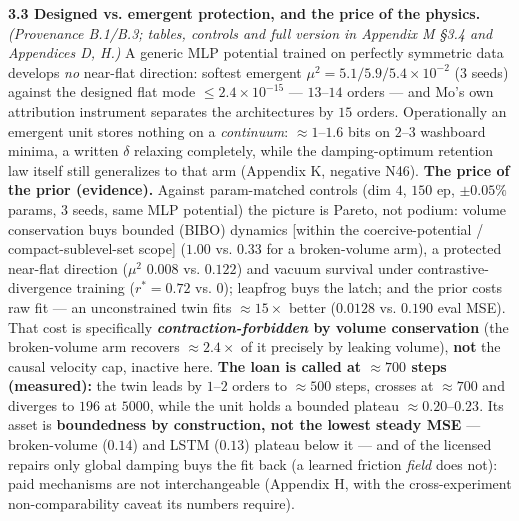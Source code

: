 \documentclass[10pt]{article}
\begin{document}
\textbf{3.3 Designed vs. emergent protection, and the price of the physics.} \emph{(Provenance B.1/B.3; tables, controls and full version in Appendix M \S3.4 and Appendices D, H.)} A generic MLP potential trained on perfectly symmetric data develops \emph{no} near-flat direction: softest emergent $\mu^2=5.1/5.9/5.4\!\times\!10^{-2}$ ($3$ seeds) against the designed flat mode $\le2.4\!\times\!10^{-15}$ --- $13$--$14$ orders --- and Mo's own attribution instrument separates the architectures by $15$ orders. Operationally an emergent unit stores nothing on a \emph{continuum}: $\approx1$--$1.6$ bits on $2$--$3$ washboard minima, a written $\delta$ relaxing completely, while the damping-optimum retention law itself still generalizes to that arm (Appendix K, negative N46). \textbf{The price of the prior (evidence).} Against param-matched controls (dim $4$, $150$ ep, $\pm0.05\%$ params, $3$ seeds, same MLP potential) the picture is Pareto, not podium: volume conservation buys bounded (BIBO) dynamics [within the coercive-potential / compact-sublevel-set scope] ($1.00$ vs. $0.33$ for a broken-volume arm), a protected near-flat direction ($\mu^2$ $0.008$ vs. $0.122$) and vacuum survival under contrastive-divergence training ($r^*=0.72$ vs. $0$); leapfrog buys the latch; and the prior costs raw fit --- an unconstrained twin fits $\approx15\times$ better ($0.0128$ vs. $0.190$ eval MSE). That cost is specifically \textbf{\emph{contraction-forbidden} by volume conservation} (the broken-volume arm recovers $\approx2.4\times$ of it precisely by leaking volume), \textbf{not} the causal velocity cap, inactive here. \textbf{The loan is called at $\approx700$ steps (measured):} the twin leads by $1$--$2$ orders to $\approx500$ steps, crosses at $\approx700$ and diverges to $196$ at $5000$, while the unit holds a bounded plateau $\approx0.20$--$0.23$. Its asset is \textbf{boundedness by construction, not the lowest steady MSE} --- broken-volume ($0.14$) and LSTM ($0.13$) plateau below it --- and of the licensed repairs only global damping buys the fit back (a learned friction \emph{field} does not): paid mechanisms are not interchangeable (Appendix H, with the cross-experiment non-comparability caveat its numbers require).
\end{document}
